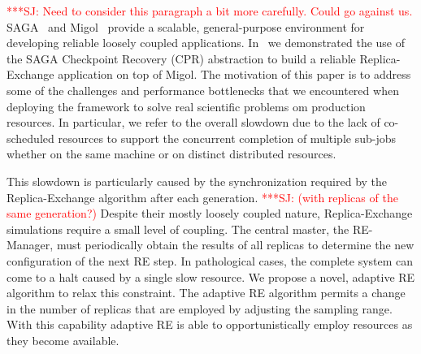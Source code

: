 \documentclass{rspublic}
\newcommand{\jhanote}[1]{ {\textcolor{red} { ***SJ: #1 }}}
\newcommand{\jhanote}[1]{}
\begin{document}
        
\jhanote{Need to consider this paragraph a bit more carefully. Could
  go against us.}         
SAGA~\citep{saga_gfd90} and Migol~\citep{schnorLuckow08} provide 
a scalable, general-purpose environment for developing reliable 
loosely coupled applications. In~\citet{Luckow:2008la} we demonstrated 
the use of the SAGA Checkpoint Recovery (CPR) abstraction to build a reliable
Replica-Exchange application on top of Migol.
The motivation of this paper is to address some of the challenges and 
performance bottlenecks that we encountered when deploying the 
framework to solve real scientific problems om production resources. 
In particular, we refer to the overall slowdown
due to the lack of co-scheduled resources to support the concurrent
completion of multiple sub-jobs whether on the same machine or on
distinct distributed resources. 

This slowdown is particularly caused by the synchronization required
by the Replica-Exchange algorithm after each generation.
\jhanote{(with replicas of the same generation?)}  Despite their
mostly loosely coupled nature, Replica-Exchange simulations require a
small level of coupling.  The central master, the RE-Manager, must
periodically obtain the results of all replicas to determine the new
configuration of the next RE step.  In pathological cases, the
complete system can come to a halt caused by a single slow
resource. We propose a novel, adaptive RE algorithm to relax this
constraint. The adaptive RE algorithm permits a change in the number
of replicas that are employed by adjusting the sampling range.  With
this capability adaptive RE is able to opportunistically employ
resources as they become available.
\end{document}
